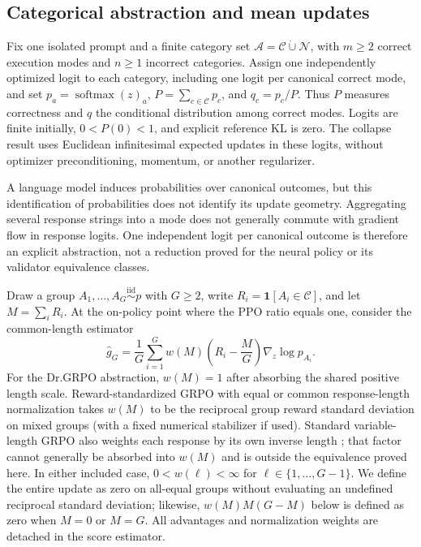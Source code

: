 \documentclass{article}
\newcommand{\1}{\mathbf 1}
\theoremstyle{remark}
\theoremstyle{definition}
\theoremstyle{plain}
\begin{document}
\subsection{Categorical abstraction and mean updates}
\label{app:theory-grpo-mean}

Fix one isolated prompt and a finite category set
$\mathcal A=\mathcal C\mathbin{\dot\cup}\mathcal N$, with $m\ge2$ correct
execution modes and $n\ge1$ incorrect categories. Assign one independently
optimized logit to each category, including one logit per canonical correct
mode, and set $p_a=\operatorname{softmax}(z)_a$,
$P=\sum_{c\in\mathcal C}p_c$, and $q_c=p_c/P$. Thus $P$ measures correctness
and $q$ the conditional distribution among correct modes. Logits are finite
initially, $0<P(0)<1$, and explicit reference KL is zero. The collapse result
uses Euclidean infinitesimal expected updates in these logits, without
optimizer preconditioning, momentum, or another regularizer.

A language model induces probabilities over canonical outcomes, but this
identification of probabilities does not identify its update geometry.
Aggregating several response strings into a mode does not generally commute
with gradient flow in response logits. One independent logit per canonical
outcome is therefore an explicit abstraction, not a reduction proved for the
neural policy or its validator equivalence classes.

Draw a group $A_1,\ldots,A_G\stackrel{\mathrm{iid}}{\sim}p$ with $G\ge2$,
write $R_i=\1[A_i\in\mathcal C]$, and let $M=\sum_iR_i$. At the on-policy
point where the PPO ratio equals one, consider the common-length estimator
\begin{equation}
  \widehat g_G
  =\frac1G\sum_{i=1}^G
   w(M)\left(R_i-\frac{M}{G}\right)\nabla_z\log p_{A_i}.
  \label{eq:group-estimator}
\end{equation}
For the Dr.GRPO abstraction, $w(M)=1$ after absorbing the shared positive
length scale. Reward-standardized GRPO with equal or common response-length
normalization takes $w(M)$ to be the reciprocal group reward standard
deviation on mixed groups (with a fixed numerical stabilizer if used).
Standard variable-length GRPO also weights each response by its own inverse
length \citep{shao2024deepseekmath,liu2025understanding}; that factor cannot
generally be absorbed into $w(M)$ and is outside the equivalence proved here.
In either included case, $0<w(\ell)<\infty$ for
$\ell\in\{1,\ldots,G-1\}$. We define the entire update as zero on all-equal
groups without evaluating an undefined reciprocal standard deviation;
likewise, $w(M)M(G-M)$ below is defined as zero when $M=0$ or $M=G$. All
advantages and normalization weights are detached in the score estimator.
\end{document}
